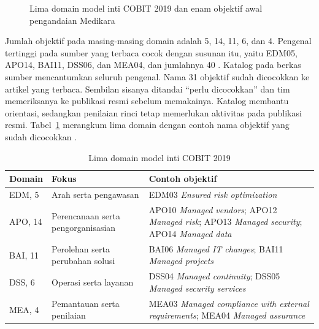 \begin{figure}[!htb]
  \centering
  
  \caption{Lima domain model inti COBIT 2019 dan enam objektif awal pengandaian Medikara}
  \label{fig:ch04-model-inti}
\end{figure}

Jumlah objektif pada masing-masing domain adalah 5, 14, 11, 6, dan 4. Pengenal tertinggi pada sumber yang
terbaca cocok dengan susunan itu, yaitu EDM05, APO14, BAI11, DSS06, dan MEA04, dan jumlahnya 40
\cite{c04-strategi,c04-perbandingan,c04-kapabilitas}. Katalog pada berkas sumber mencantumkan seluruh
pengenal. Nama 31 objektif sudah dicocokkan ke artikel yang terbaca. Sembilan sisanya ditandai
``perlu dicocokkan'' dan tim memeriksanya ke publikasi resmi sebelum memakainya. Katalog membantu orientasi,
sedangkan penilaian rinci tetap memerlukan aktivitas pada publikasi resmi. Tabel~\ref{tab:ch04-domain}
merangkum lima domain dengan contoh nama objektif yang sudah dicocokkan
\cite{c04-kapabilitas,c04-strategi,c04-perbandingan}.

\begin{table}[!htb]
  \centering\small
  \caption{Lima domain model inti COBIT 2019}\label{tab:ch04-domain}
  \begin{tabularx}{\textwidth}{|>{\raggedright\arraybackslash}p{}|>{\raggedright\arraybackslash}p{}|>{\raggedright\arraybackslash}X|}
    \hline
    \textbf{Domain} & \textbf{Fokus} & \textbf{Contoh objektif} \\ \hline
    EDM, 5 & Arah serta pengawasan & EDM03 \textit{Ensured risk optimization} \\ \hline
    APO, 14 & Perencanaan serta pengorganisasian & APO10 \textit{Managed vendors}; APO12
    \textit{Managed risk}; APO13 \textit{Managed security}; APO14 \textit{Managed data} \\ \hline
    BAI, 11 & Perolehan serta perubahan solusi & BAI06 \textit{Managed IT changes}; BAI11
    \textit{Managed projects} \\ \hline
    DSS, 6 & Operasi serta layanan & DSS04 \textit{Managed continuity}; DSS05 \textit{Managed
    security services} \\ \hline
    MEA, 4 & Pemantauan serta penilaian & MEA03 \textit{Managed compliance with external requirements};
    MEA04 \textit{Managed assurance} \\ \hline
  \end{tabularx}
\end{table}

